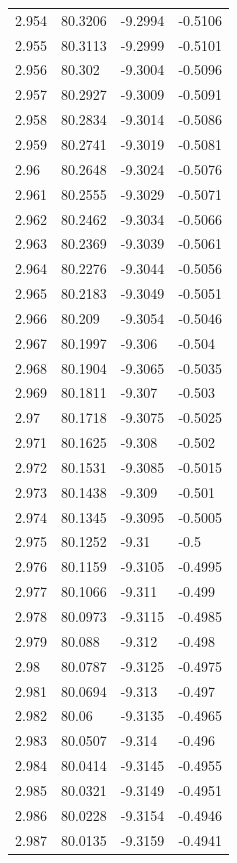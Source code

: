 \begin{tabular}{llll}
2.954 & 80.3206 & -9.2994 & -0.5106 \\
2.955 & 80.3113 & -9.2999 & -0.5101 \\
2.956 & 80.302 & -9.3004 & -0.5096 \\
2.957 & 80.2927 & -9.3009 & -0.5091 \\
2.958 & 80.2834 & -9.3014 & -0.5086 \\
2.959 & 80.2741 & -9.3019 & -0.5081 \\
2.96 & 80.2648 & -9.3024 & -0.5076 \\
2.961 & 80.2555 & -9.3029 & -0.5071 \\
2.962 & 80.2462 & -9.3034 & -0.5066 \\
2.963 & 80.2369 & -9.3039 & -0.5061 \\
2.964 & 80.2276 & -9.3044 & -0.5056 \\
2.965 & 80.2183 & -9.3049 & -0.5051 \\
2.966 & 80.209 & -9.3054 & -0.5046 \\
2.967 & 80.1997 & -9.306 & -0.504 \\
2.968 & 80.1904 & -9.3065 & -0.5035 \\
2.969 & 80.1811 & -9.307 & -0.503 \\
2.97 & 80.1718 & -9.3075 & -0.5025 \\
2.971 & 80.1625 & -9.308 & -0.502 \\
2.972 & 80.1531 & -9.3085 & -0.5015 \\
2.973 & 80.1438 & -9.309 & -0.501 \\
2.974 & 80.1345 & -9.3095 & -0.5005 \\
2.975 & 80.1252 & -9.31 & -0.5 \\
2.976 & 80.1159 & -9.3105 & -0.4995 \\
2.977 & 80.1066 & -9.311 & -0.499 \\
2.978 & 80.0973 & -9.3115 & -0.4985 \\
2.979 & 80.088 & -9.312 & -0.498 \\
2.98 & 80.0787 & -9.3125 & -0.4975 \\
2.981 & 80.0694 & -9.313 & -0.497 \\
2.982 & 80.06 & -9.3135 & -0.4965 \\
2.983 & 80.0507 & -9.314 & -0.496 \\
2.984 & 80.0414 & -9.3145 & -0.4955 \\
2.985 & 80.0321 & -9.3149 & -0.4951 \\
2.986 & 80.0228 & -9.3154 & -0.4946 \\
2.987 & 80.0135 & -9.3159 & -0.4941 \\

\end{tabular}
